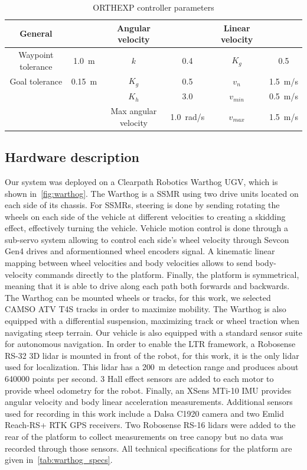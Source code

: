 \begin{table}[htpb]
	\caption{\ac{ORTHEXP} controller parameters} \label{tab:orthexp_params}
	\begin{center}
		\begin{tabular}{c c | c c | c c}
			General & & Angular velocity & & Linear velocity \\
			\hline
			Waypoint tolerance & \SI{1.0}{m} & $k$ & 0.4 & $K_g$ & 0.5 \\
			Goal tolerance & \SI{0.15}{m} & $K_g$ & 0.5 & $v_n$ & \SI{1.5}{m/s} \\
			 & & $K_h$ & 3.0 & $v_{min}$ & \SI{0.5}{m/s} \\
			 & & Max angular velocity & \SI{1.0}{rad/s} & $v_{max}$ & \SI{1.5}{m/s} \\
		\end{tabular}
	\end{center}
\end{table}

\subsection{Hardware description}
\label{sec:hardware}

Our system was deployed on a Clearpath Robotics Warthog \ac{UGV}, which is shown in~\autoref{fig:warthog}. 
The Warthog is a \ac{SSMR} using two drive units located on each side of its chassis. 
For \acp{SSMR}, steering is done by sending rotating the wheels on each side of the vehicle at different velocities to creating a skidding effect, effectively turning the vehicle.
Vehicle motion control is done through a sub-servo system allowing to control each side's wheel velocity through Sevcon Gen4 drives and aformentionned wheel encoders signal.
A kinematic linear mapping between wheel velocities and body velocities allows to send body-velocity commands directly to the platform.
Finally, the platform is symmetrical, meaning that it is able to drive along each path both forwards and backwards.
The Warthog can be mounted wheels or tracks, for this work, we selected CAMSO ATV T4S tracks in order to maximize mobility. 
The Warthog is also equipped with a differential suspension, maximizing track or wheel traction when navigating steep terrain.
Our vehicle is also equipped with a standard sensor suite for autonomous navigation. 
In order to enable the \ac{LTR} framework, a Robosense RS-32 3D lidar is mounted in front of the robot, for this work, it is the only lidar used for localization.
This lidar has a \SI{200}{m} detection range and produces about \SI{640000}{} points per second.
3 Hall effect sensors are added to each motor to provide wheel odometry for the robot. 
Finally, an XSens MTi-10 \ac{IMU} provides angular velocity and body linear acceleration measurements. 
Additional sensors used for recording in this work include a Dalsa C1920 camera and two Emlid Reach-RS+ \ac {RTK} \ac{GPS} receivers.
Two Robosense RS-16 lidars were added to the rear of the platform to collect measurements on tree canopy but no data was recorded through those sensors. 
All technical specifications for the platform are given in~\autoref{tab:warthog_specs}.


